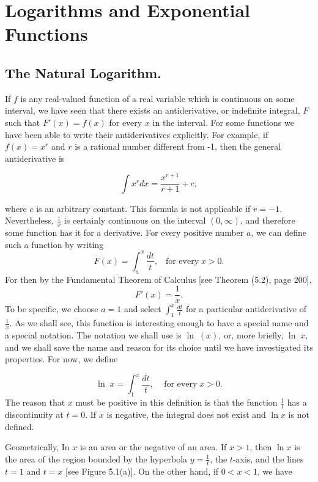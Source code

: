 \chapter{Logarithms and Exponential Functions}\label{chp 5}
 
\section{The Natural Logarithm.}\label{sec 5.1} 
 If $f$ is any real-valued function of a real variable which is continuous on some interval, we have seen that there exists an antiderivative, or indefinite integral, $F$ such that $F'(x) = f(x)$ for every $x$ in the interval. For some functions we have been able to write their antiderivatives explicitly. For example, if $f(x) = x^r$ and $r$ is a rational number different from -1, then the general antiderivative is

$$
\int x^{r} dx = \frac{x^{r + 1}}{r + 1} + c,
$$

\noindent where $c$ is an arbitrary constant. This formula is not applicable if $r = - 1$. Nevertheless, $\frac{1}{x}$ is certainly continuous on the interval $(0, \infty)$, and therefore some function has it for a derivative. For every positive number $a$, we can define such a function by writing
$$
F(x) = \int_{a}^{x} \frac{dt}{t}, \;\;\;\mbox{for every}\; x > 0.
$$
For then by the Fundamental Theorem of Calculus [see Theorem (5.2), page 200],
$$
F'(x)= \frac{1}{x}.
$$
To be specific, we choose $a = 1$ and select $\int_{1}^{x} \frac{dt}{t}$ for a particular antiderivative of $\frac{1}{x}$. As we shall see, this function is interesting enough to have a special name and a special notation. The notation we shall use is $\ln\;(x)$, or, more briefly, $\ln\; x$, and we shall save the name and reason for its choice until we have investigated its properties.
For now, we define

$$
\ln\; x = \int_{1}^{x} \frac{dt}{t}, \;\;\;\mbox{ for every}\; x > 0. 
$$
\noindent The reason that $x$ must be positive in this definition is that the function $\frac{1}{t}$ has a discontinuity at $t = 0$. If $x$ is negative, the integral does not exist and $\ln x$ is not defined.

Geometrically, In $x$ is an area or the negative of an area. If $x > 1$, then $\ln x$ is the area of the region bounded by the hyperbola $y = \frac{1}{t}$, the $t$-axis, and the lines $t = 1$ and $t = x$ [see Figure \f{5.1}(a)]. On the other hand, if $0 < x < 1$, we have

